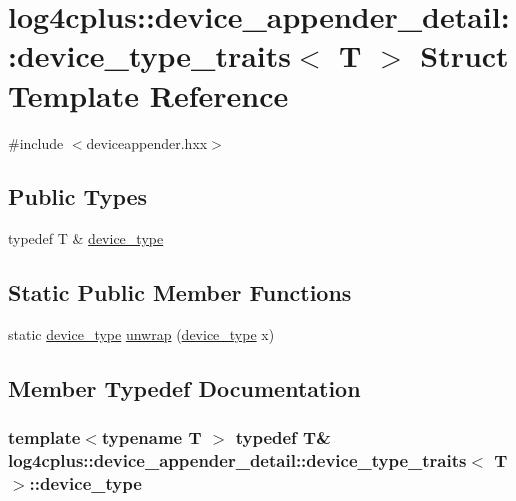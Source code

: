 \hypertarget{structlog4cplus_1_1device__appender__detail_1_1device__type__traits}{\section{log4cplus\-:\-:device\-\_\-appender\-\_\-detail\-:\-:device\-\_\-type\-\_\-traits$<$ T $>$ Struct Template Reference}
\label{structlog4cplus_1_1device__appender__detail_1_1device__type__traits}
}


{\ttfamily \#include $<$deviceappender.\-hxx$>$}

\subsection*{Public Types}
\begin{DoxyCompactItemize}
\item 
typedef T \& \hyperlink{structlog4cplus_1_1device__appender__detail_1_1device__type__traits_a302a3631da80b1b7944eb4edb6690730}{device\-\_\-type}
\end{DoxyCompactItemize}
\subsection*{Static Public Member Functions}
\begin{DoxyCompactItemize}
\item 
static \hyperlink{structlog4cplus_1_1device__appender__detail_1_1device__type__traits_a302a3631da80b1b7944eb4edb6690730}{device\-\_\-type} \hyperlink{structlog4cplus_1_1device__appender__detail_1_1device__type__traits_a845c890f35426ee7315e6f5eda05d0b9}{unwrap} (\hyperlink{structlog4cplus_1_1device__appender__detail_1_1device__type__traits_a302a3631da80b1b7944eb4edb6690730}{device\-\_\-type} x)
\end{DoxyCompactItemize}


\subsection{Member Typedef Documentation}
\hypertarget{structlog4cplus_1_1device__appender__detail_1_1device__type__traits_a302a3631da80b1b7944eb4edb6690730}{
\subsubsection[{device\-\_\-type}]{\setlength{\rightskip}{0pt plus 5cm}template$<$typename T $>$ typedef T\& {\bf log4cplus\-::device\-\_\-appender\-\_\-detail\-::device\-\_\-type\-\_\-traits}$<$ T $>$\-::{\bf device\-\_\-type}}}\label{structlog4cplus_1_1device__appender__detail_1_1device__type__traits_a302a3631da80b1b7944eb4edb6690730}


